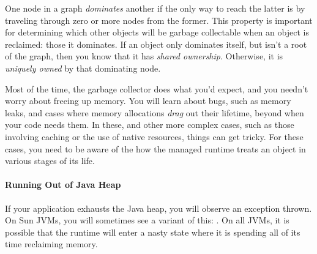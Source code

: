  {
\label{sec:dominance} One node in a graph \emph{dominates}
another if the only way to reach the latter is by traveling through zero or more
nodes from the former.
This property is important for determining which other objects will be garbage
collectable when an object is reclaimed: those it dominates. If an object only
dominates itself, but isn't a root of the graph, then you know that it has
\emph{shared ownership}. Otherwise, it is
\emph{uniquely owned} by that dominating node.}

Most of the time, the garbage collector does what you'd expect, and you needn't
worry about freeing up memory. You will learn about bugs, such as memory leaks,
and cases where memory allocations \emph{drag} out their lifetime, beyond when
your code needs them. In these, and other more complex cases, such as those
involving caching or the use of native resources, things can get tricky. For
these cases, you need to be aware of the how the managed runtime treats an
object in various stages of its life.

\paragraph{Running Out of Java Heap}
If your application exhausts the Java heap, you will observe an
 exception thrown. On
Sun JVMs, you will sometimes see a variant of this: . On all JVMs, it is possible that
the runtime will enter a nasty state where it is spending all of its time
reclaiming memory.



